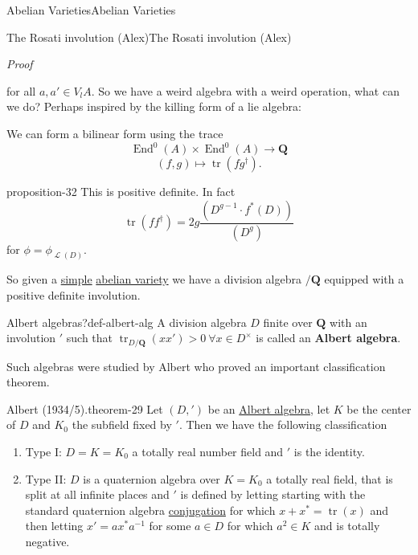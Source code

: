 \documentclass[10pt,]{book}
\makeatletter
\newcommand{\terminology}[1]{\textbf{#1}}
\renewcommand*{\proofname}{Proof}
\renewenvironment{proof}[1][\proofname]{\par
  \pushQED{\qed}%
  \normalfont \topsep6\p@\@plus6\p@\relax
  \trivlist
  \item\relax
    {\itshape
    #1\@addpunct{.}}\hspace\labelsep\ignorespaces
}{%
  \popQED\endtrivlist\@endpefalse
}
\numberwithin{equation}{section}
\newcommand{\sheaf}[1]{\operatorname{\mathcal{#1}}}
\newcommand{\QQ}{\mathbf{Q}}
\DeclareMathOperator{\End}{End}
\DeclareMathOperator{\tr}{tr}
\makeatother
\begin{document}
\begin{chapterptx}{Abelian Varieties}{}{Abelian Varieties}{}{}
\begin{sectionptx}{The Rosati involution (Alex)}{}{The Rosati involution (Alex)}{}{}
\begin{proof}
\begin{equation*}
\end{equation*}
for all \(a,a'\in V_l A\).%
\end{proof}
\hypertarget{p-340}{}%
So we have a weird algebra with a weird operation, what can we do? Perhaps inspired by the killing form of a lie algebra:%
\par
\hypertarget{p-341}{}%
We can form a bilinear form using the trace%
\begin{equation*}
\End^0(A) \times \End^0(A) \to \QQ
\end{equation*}
%
\begin{equation*}
(f,g) \mapsto \tr(fg^\dagger)\text{.}
\end{equation*}
%
\begin{proposition}{}{}{proposition-32}%
\hypertarget{p-342}{}%
This is positive definite. In fact%
\begin{equation*}
\tr(ff^\dagger) = 2g\frac{(D^{g-1}\cdot f^*(D))}{(D^g)}
\end{equation*}
for \(\phi = \phi_{\sheaf L(D)}\).%
\end{proposition}
\hypertarget{p-343}{}%
So given a \hyperref[def-simple-av]{simple} \hyperref[def-buntes-abvar]{abelian variety} we have a division algebra  \(/ \QQ\) equipped with  a positive definite involution.%
\begin{definition}{Albert algebras?}{def-albert-alg}%
\hypertarget{p-344}{}%
A division algebra \(D\) finite over \(\QQ\) with an involution \('\) such that \(\tr_{D/\QQ}(xx') > 0\ \forall x\in D^\times\) is called an \terminology{Albert algebra}.%
\end{definition}
\hypertarget{p-345}{}%
Such algebras were studied by Albert who proved an important classification theorem.%
\begin{theorem}{Albert (1934/5).}{}{theorem-29}%
\hypertarget{p-346}{}%
Let \((D, ')\) be an \hyperref[def-albert-alg]{Albert algebra}, let \(K\) be the center of \(D\) and \(K_0\) the subfield fixed by \('\). Then we have the following classification\leavevmode%
\begin{enumerate}
\item\hypertarget{li-56}{}Type I: \(D = K = K_0\) a totally real number field and \('\) is the identity.%
\item\hypertarget{li-57}{}Type II: \(D\) is a quaternion algebra over \(K = K_0\) a totally real field, that is split at all infinite places and \('\) is defined by letting starting with the standard quaternion algebra \hyperref[def-quat-alg-conj-trace-norm]{conjugation} for which \(x + x^* = \tr(x)\) and then letting \(x' = ax^* a^{-1}\) for some \(a \in D\) for which \(a^2 \in K\) and is totally negative.%

\end{enumerate}
\end{theorem}
\end{sectionptx}
\end{chapterptx}
\end{document}
